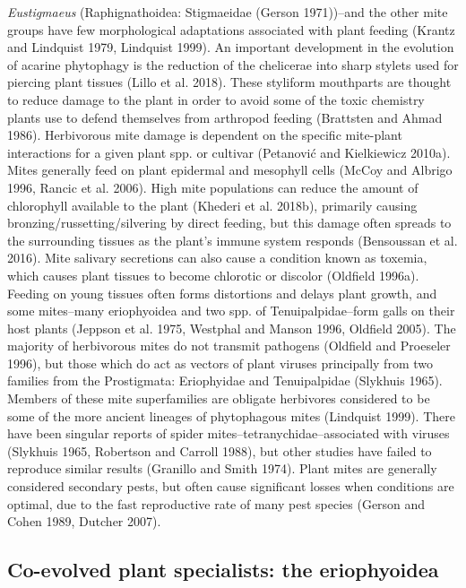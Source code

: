 \documentclass[12pt,final,CPage]{ufthesis}
\begin{document}
{\emph{Eustigmaeus} (Raphignathoidea: Stigmaeidae (Gerson 1971))--and the other mite groups have few morphological adaptations associated with plant feeding (Krantz and Lindquist 1979, Lindquist 1999). An important development in the evolution of acarine phytophagy is the reduction of the chelicerae into sharp stylets used for piercing plant tissues (Lillo et al. 2018). These styliform mouthparts are thought to reduce damage to the plant in order to avoid some of the toxic chemistry plants use to defend themselves from arthropod feeding (Brattsten and Ahmad 1986). Herbivorous mite damage is dependent on the specific mite-plant interactions for a given plant spp. or cultivar (Petanović and Kielkiewicz 2010a). Mites generally feed on plant epidermal and mesophyll cells (McCoy and Albrigo 1996, Rancic et al. 2006). High mite populations can reduce the amount of chlorophyll available to the plant (Khederi et al. 2018b), primarily causing bronzing/russetting/silvering by direct feeding, but this damage often spreads to the surrounding tissues as the plant's immune system responds (Bensoussan et al. 2016). Mite salivary secretions can also cause a condition known as toxemia, which causes plant tissues to become chlorotic or discolor (Oldfield 1996a). Feeding on young tissues often forms distortions and delays plant growth, and some mites--many eriophyoidea and two spp. of Tenuipalpidae--form galls on their host plants (Jeppson et al. 1975, Westphal and Manson 1996, Oldfield 2005). The majority of herbivorous mites do not transmit pathogens (Oldfield and Proeseler 1996), but those which do act as vectors of plant viruses principally from two families from the Prostigmata: Eriophyidae and Tenuipalpidae (Slykhuis 1965). Members of these mite superfamilies are obligate herbivores considered to be some of the more ancient lineages of phytophagous mites (Lindquist 1999). There have been singular reports of spider mites--tetranychidae--associated with viruses (Slykhuis 1965, Robertson and Carroll 1988), but other studies have failed to reproduce similar results (Granillo and Smith 1974). Plant mites are generally considered secondary pests, but often cause significant losses when conditions are optimal, due to the fast reproductive rate of many pest species (Gerson and Cohen 1989, Dutcher 2007).

  \hypertarget{litrev-erios}{%
  \subsection{Co-evolved plant specialists: the eriophyoidea}\label{litrev-erios}}

}
\end{document}
